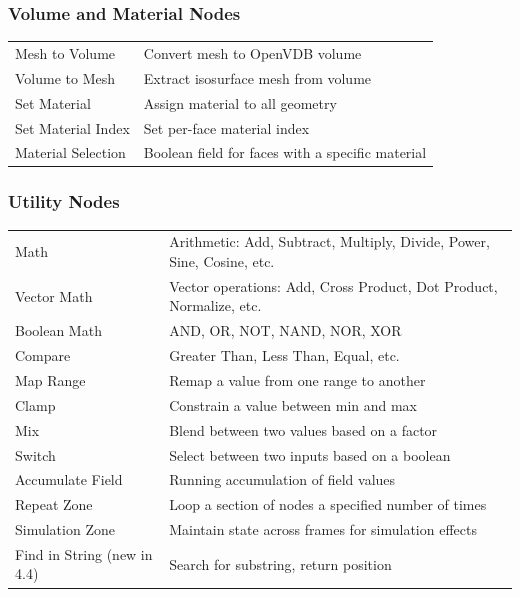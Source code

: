 \subsubsection{Volume and Material Nodes}

\begin{center}
\begin{tabularx}{\textwidth}{L{4cm}X}
\toprule
{}
 &  \\
\midrule
Mesh to Volume & Convert mesh to OpenVDB volume \\
Volume to Mesh & Extract isosurface mesh from volume \\
Set Material & Assign material to all geometry \\
Set Material Index & Set per-face material index \\
Material Selection & Boolean field for faces with a specific material \\
\bottomrule
\end{tabularx}
\end{center}

\subsubsection{Utility Nodes}

\begin{center}
\begin{tabularx}{\textwidth}{L{4cm}X}
\toprule
{}
 &  \\
\midrule
Math & Arithmetic: Add, Subtract, Multiply, Divide, Power, Sine, Cosine, etc. \\
Vector Math & Vector operations: Add, Cross Product, Dot Product, Normalize, etc. \\
Boolean Math & AND, OR, NOT, NAND, NOR, XOR \\
Compare & Greater Than, Less Than, Equal, etc. \\
Map Range & Remap a value from one range to another \\
Clamp & Constrain a value between min and max \\
Mix & Blend between two values based on a factor \\
Switch & Select between two inputs based on a boolean \\
Accumulate Field & Running accumulation of field values \\
Repeat Zone & Loop a section of nodes a specified number of times \\
Simulation Zone & Maintain state across frames for simulation effects \\
Find in String (new in 4.4) & Search for substring, return position \\
\bottomrule
\end{tabularx}
\end{center}

